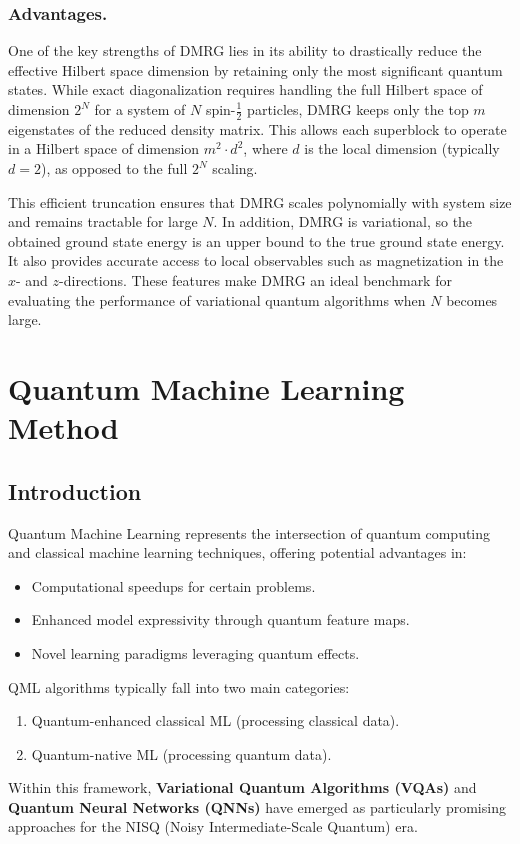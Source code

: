 \documentclass[pre,twocolumn,floatfix]{revtex4-1}
\begin{document}
\subsubsection{Advantages.}
One of the key strengths of DMRG lies in its ability to drastically reduce the effective Hilbert space dimension by retaining only the most significant quantum states. While exact diagonalization requires handling the full Hilbert space of dimension $2^N$ for a system of $N$ spin-$\tfrac{1}{2}$ particles, DMRG keeps only the top $m$ eigenstates of the reduced density matrix. This allows each superblock to operate in a Hilbert space of dimension $m^2 \cdot d^2$, where $d$ is the local dimension (typically $d=2$), as opposed to the full $2^N$ scaling.

This efficient truncation ensures that DMRG scales polynomially with system size and remains tractable for large $N$. In addition, DMRG is variational, so the obtained ground state energy is an upper bound to the true ground state energy. It also provides accurate access to local observables such as magnetization in the $x$- and $z$-directions. These features make DMRG an ideal benchmark for evaluating the performance of variational quantum algorithms when $N$ becomes large.

\section{Quantum Machine Learning Method} 
\subsection{Introduction}
Quantum Machine Learning represents the intersection of quantum computing and classical machine learning techniques, offering potential advantages in:
\begin{itemize}
    \item Computational speedups for certain problems.
    \item Enhanced model expressivity through quantum feature maps.
    \item Novel learning paradigms leveraging quantum effects.
\end{itemize}

QML algorithms typically fall into two main categories:
\begin{enumerate}
    \item Quantum-enhanced classical ML (processing classical data).
    \item Quantum-native ML (processing quantum data).
\end{enumerate}
Within this framework, \textbf{Variational Quantum Algorithms (VQAs)} and \textbf{Quantum Neural Networks (QNNs)} have emerged as particularly promising approaches for the NISQ (Noisy Intermediate-Scale Quantum) era.
\end{document}
